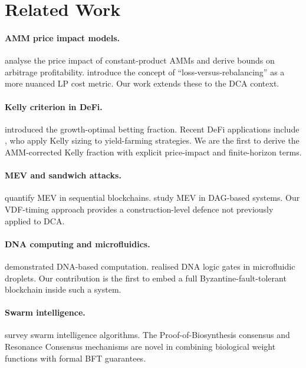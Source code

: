 \documentclass[12pt,a4paper]{article}
\begin{document}
\section{Related Work}
\label{sec:related}

\paragraph{AMM price impact models.}
\citet{angeris2020} analyse the price impact of constant-product AMMs and
derive bounds on arbitrage profitability.  \citet{milionis2022} introduce the
concept of ``loss-versus-rebalancing'' as a more nuanced LP cost metric.
Our work extends these to the DCA context.

\paragraph{Kelly criterion in DeFi.}
\citet{kelly1956} introduced the growth-optimal betting fraction.  Recent DeFi
applications include \citet{alphafin2023}, who apply Kelly sizing to
yield-farming strategies.  We are the first to derive the AMM-corrected Kelly
fraction with explicit price-impact and finite-horizon terms.

\paragraph{MEV and sandwich attacks.}
\citet{daian2020} quantify MEV in sequential blockchains.  \citet{babel2023}
study MEV in DAG-based systems.  Our VDF-timing approach provides a
construction-level defence not previously applied to DCA.

\paragraph{DNA computing and microfluidics.}
\citet{adleman1994} demonstrated DNA-based computation.  \citet{chen2013}
realised DNA logic gates in microfluidic droplets.  Our contribution is the
first to embed a full Byzantine-fault-tolerant blockchain inside such a
system.

\paragraph{Swarm intelligence.}
\citet{dorigo2004} survey swarm intelligence algorithms.  The
Proof-of-Biosynthesis consensus and Resonance Consensus mechanisms are novel
in combining biological weight functions with formal BFT guarantees.
\end{document}
